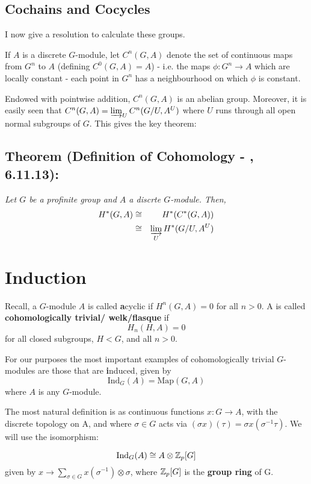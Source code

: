 \subsection*{Cochains and Cocycles} 

I now give a resolution to calculate these groups.

If $A$ is a discrete $G$-module, let $C^n(G,A)$ denote the set of continuous maps from $G^n$ to $A$ (defining $C^0(G,A) = A$) - i.e. the maps $\phi:G^n\rightarrow A$ which are locally constant - each point in $G^n$ has a neighbourhood on which $\phi$ is constant.

Endowed with pointwise addition, $C^n(G,A)$ is an abelian group. Moreover, it is easily seen that $C^n(G,A) = \varinjlim_U  C^n(G/U , A^U)$ where $U$ runs through all open normal subgroups of $G$. This gives the key theorem:

\subsection*{Theorem (Definition of Cohomology - \cite{W}, 6.11.13):}
\emph{Let $G$ be a profinite group and $A$ a discrte $G$-module. Then,
\begin{eqnarray}
\nonumber    H^*(G,A)   &\cong& H^*(C^*(G,A))     \\
\nonumber                       &\cong& \varinjlim_U H^*(G/U, A^U)
\end{eqnarray}}



\section{Induction}

Recall, a $G$-module $A$ is called \textbf acyclic  if $H^n (G,A)
= 0$ for all $n>0$. A is called \textbf{cohomologically trivial/
welk/flasque} if $$H_n(H,A) = 0$$ for all closed subgroups, $H<G$,
and all $n>0$.

For our purposes the most important examples of cohomologically
trivial $G$-modules are those that are \textbf induced, given by
$$\text{Ind}_G(A) = \text{Map}(G,A)$$ where $A$ is any $G$-module.

The most natural definition is as continuous functions $x:
G\rightarrow A$, with the discrete topology on A, and where
$\sigma\in G$ acts via $(\sigma x) (\tau) = \sigma x (\sigma^{-1}
\tau)$. We will use the isomorphism:

$$\text{Ind}_G(A) \cong A\otimes \mathbb Z_p  [G]$$ given by $x\rightarrow
\sum_{\sigma\in G} x(\sigma^{-1})\otimes \sigma$, where $\mathbb Z_p [G]$
is the \textbf{group ring} of G.

